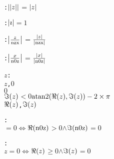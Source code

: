 \begin{alltt}
  :  \(\absonefn{\absonefn{z}}\) \(=\) \(\absonefn{z}\)\vspace*{\pvsdeclspacing}

  :  \(\absonefn{{\imath}}\) \(=\) \(1\)\vspace*{\pvsdeclspacing}

  :  \(\absonefn{\opdividetwofn{z}{\pvsid{nzx}}}\) \(=\) \(\opdividetwofn{\absonefn{z}}{\absonefn{\pvsid{nzx}}}\)\vspace*{\pvsdeclspacing}

  :  \(\absonefn{\opdividetwofn{x}{\pvsid{n0z}}}\) \(=\) \(\opdividetwofn{\absonefn{x}}{\absonefn{\pvsid{n0z}}}\)\vspace*{\pvsdeclspacing}

   


   


   


   


   


   


   


   


  \pvsid{(}\(z\)\pvsid{)}:  \pvskey{=}
       \pvsid{(}\(z\), \(0\)\pvsid{)}
         \(0\)
       \(\Imonefn{z}\) \(<\) \(0\)  \(\opdifferencetwofn{\pvsid{atan2}\pvsid{(}\Reonefn{z}, \Imonefn{z}\pvsid{)}}{\optimestwofn{2}{\pi}}\)
       \pvsid{(}\(\Reonefn{z}\), \(\Imonefn{z}\)\pvsid{)}
      \vspace*{\pvsdeclspacing}

  : 
    \pvsid{(}\pvsid{)} \(=\) \(0\) \(\Leftrightarrow\) \pvsid{(}\(\Reonefn{\pvsid{n0z}}\) \(>\) \(0\) \(\wedge\) \(\Imonefn{\pvsid{n0z}}\) \(=\) \(0\)\pvsid{)}\vspace*{\pvsdeclspacing}

  : 
    \pvsid{(}\(z\)\pvsid{)} \(=\) \(0\) \(\Leftrightarrow\) \pvsid{(}\(\Reonefn{z}\) \(\geq\) \(0\) \(\wedge\) \(\Imonefn{z}\) \(=\) \(0\)\pvsid{)}\vspace*{\pvsdeclspacing}


\end{alltt}
